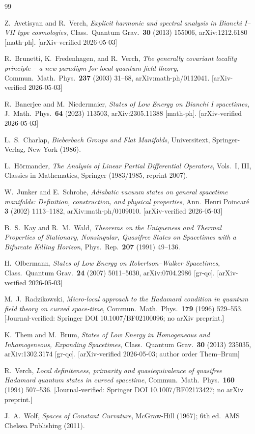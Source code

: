 \documentclass[12pt, a4paper]{article}
\theoremstyle{remark}
\begin{document}
\begin{thebibliography}{99}

Z.~Avetisyan and R.~Verch,
\emph{Explicit harmonic and spectral analysis in Bianchi I--VII type cosmologies},
Class.\ Quantum Grav.\ \textbf{30} (2013) 155006,
arXiv:1212.6180 [math-ph].
[arXiv-verified 2026-05-03]

R.~Brunetti, K.~Fredenhagen, and R.~Verch,
\emph{The generally covariant locality principle -- a new paradigm for
local quantum field theory},
Commun.\ Math.\ Phys.\ \textbf{237} (2003) 31--68,
arXiv:math-ph/0112041.
[arXiv-verified 2026-05-03]

R.~Banerjee and M.~Niedermaier,
\emph{States of Low Energy on Bianchi I spacetimes},
J.\ Math.\ Phys.\ \textbf{64} (2023) 113503,
arXiv:2305.11388 [math-ph].
[arXiv-verified 2026-05-03]

L.~S.~Charlap,
\emph{Bieberbach Groups and Flat Manifolds},
Universitext, Springer-Verlag, New York (1986).

L.~H\"ormander,
\emph{The Analysis of Linear Partial Differential Operators}, Vols.~I, III,
Classics in Mathematics, Springer (1983/1985, reprint 2007).

W.~Junker and E.~Schrohe,
\emph{Adiabatic vacuum states on general spacetime manifolds: Definition,
construction, and physical properties},
Ann.\ Henri Poincar\'e \textbf{3} (2002) 1113--1182,
arXiv:math-ph/0109010.
[arXiv-verified 2026-05-03]

B.~S.~Kay and R.~M.~Wald,
\emph{Theorems on the Uniqueness and Thermal Properties of Stationary,
Nonsingular, Quasifree States on Spacetimes with a Bifurcate Killing
Horizon},
Phys.\ Rep.\ \textbf{207} (1991) 49--136.

H.~Olbermann,
\emph{States of Low Energy on Robertson--Walker Spacetimes},
Class.\ Quantum Grav.\ \textbf{24} (2007) 5011--5030,
arXiv:0704.2986 [gr-qc].
[arXiv-verified 2026-05-03]

M.~J.~Radzikowski,
\emph{Micro-local approach to the Hadamard condition in quantum field
theory on curved space-time},
Commun.\ Math.\ Phys.\ \textbf{179} (1996) 529--553.
[Journal-verified: Springer DOI 10.1007/BF02100096; no arXiv preprint.]

K.~Them and M.~Brum,
\emph{States of Low Energy in Homogeneous and Inhomogeneous, Expanding
Spacetimes},
Class.\ Quantum Grav.\ \textbf{30} (2013) 235035,
arXiv:1302.3174 [gr-qc].
[arXiv-verified 2026-05-03; author order Them--Brum]

R.~Verch,
\emph{Local definiteness, primarity and quasiequivalence of quasifree
Hadamard quantum states in curved spacetime},
Commun.\ Math.\ Phys.\ \textbf{160} (1994) 507--536.
[Journal-verified: Springer DOI 10.1007/BF02173427; no arXiv preprint.]

J.~A.~Wolf,
\emph{Spaces of Constant Curvature},
McGraw-Hill (1967); 6th ed.\ AMS Chelsea Publishing (2011).

\end{thebibliography}
\end{document}
